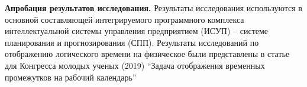 \indent \textbf{Апробация результатов исследования.}
Результаты исследования используются в основной составляющей интегрируемого программного комплекса интеллектуальной системы управления предприятием (ИСУП) – системе планирования и прогнозирования (СПП). 
Результаты исследований по отображению логического времени на физическое были представлены в статье для Конгресса молодых ученых (2019) ``Задача отображения временных промежутков на рабочий календарь''

